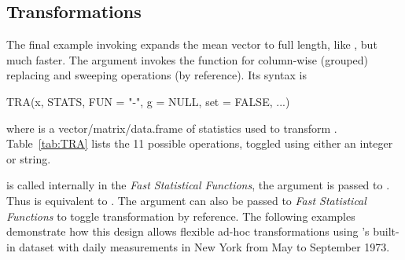 \documentclass[article]{jss}
\newcommand{\fct}[1]{\code{#1()}}
\begin{document}
\subsection{Transformations}
The final example invoking  expands the mean vector to full length, like , but much faster. The  argument invokes the \fct{TRA} function for column-wise (grouped) replacing and sweeping operations (by reference). Its syntax is
\begin{Code}
TRA(x, STATS, FUN = "-", g = NULL, set = FALSE, ...)
\end{Code}
where  is a vector/matrix/data.frame of statistics used to transform . Table~\ref{tab:TRA} lists the 11 possible  operations, toggled using either an integer or string.
%
\begin{table}[h!]
\caption{\label{tab:TRA} Arguments to .}
\end{table}
%
 is called internally in the \emph{Fast Statistical Functions}, the  argument is passed to . Thus  is equivalent to . The  argument can also be passed to \emph{Fast Statistical Functions} to toggle transformation by reference. The following examples demonstrate how this design allows flexible ad-hoc transformations using 's built-in  dataset with daily measurements in New York from May to September 1973.
\end{document}
